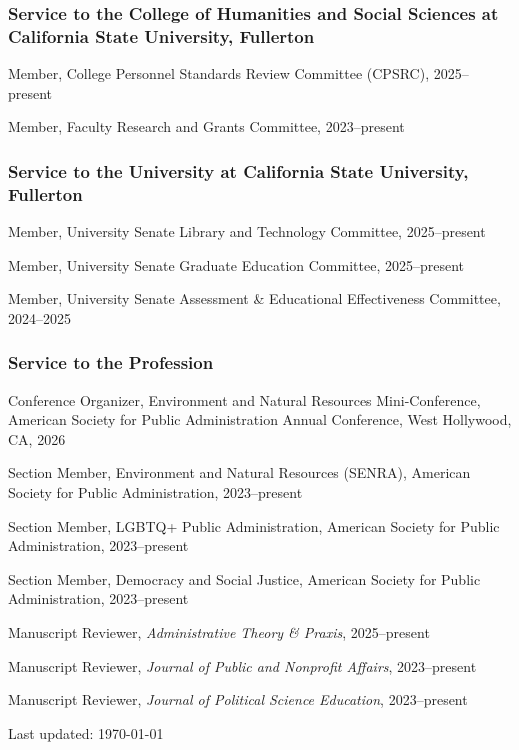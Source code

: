 \documentclass[12pt,letterpaper]{article}
\renewenvironment{itemize}{
  \begin{list}{}{
    \setlength{\leftmargin}{1.5em}
    \setlength{\itemsep}{0.25em}
    \setlength{\parskip}{0pt}
    \setlength{\parsep}{0.25em}
  }
}{
  \end{list}
}
\newcommand\tagpdfsetup[1]{}
\begin{document}
\subsubsection*{Service to the College of Humanities and Social Sciences at California State University, Fullerton}
\begin{itemize}\leftmargin=2pt\itemindent=-15pt
  \item Member, College Personnel Standards Review Committee (CPSRC), 2025--present
  \item Member, Faculty Research and Grants Committee, 2023--present
\end{itemize}

\subsubsection*{Service to the University at California State University, Fullerton}
\begin{itemize}\leftmargin=2pt\itemindent=-15pt
  \item Member, University Senate Library and Technology Committee, 2025--present
  \item Member, University Senate Graduate Education Committee, 2025--present
  \item Member, University Senate Assessment \& Educational Effectiveness Committee, 2024--2025
\end{itemize}

\subsubsection*{Service to the Profession}
\begin{itemize}\leftmargin=2pt\itemindent=-15pt
  \item Conference Organizer, Environment and Natural Resources Mini-Conference, American Society for Public Administration Annual Conference, West Hollywood, CA, 2026
  \item Section Member, Environment and Natural Resources (SENRA), American Society for Public Administration, 2023--present
  \item Section Member, LGBTQ+ Public Administration, American Society for Public Administration, 2023--present
  \item Section Member, Democracy and Social Justice, American Society for Public Administration, 2023--present
  \item Manuscript Reviewer, \emph{Administrative Theory \& Praxis}, 2025--present
  \item Manuscript Reviewer, \emph{Journal of Public and Nonprofit Affairs}, 2023--present
  \item Manuscript Reviewer, \emph{Journal of Political Science Education}, 2023--present
\end{itemize}

	
  \tagpdfsetup{activate-all=true, interwordspace=true}
\vspace{1em}
\begin{center}
  \begin{small}
    Last updated: \today
      \end{small}
\end{center}
\end{document}
